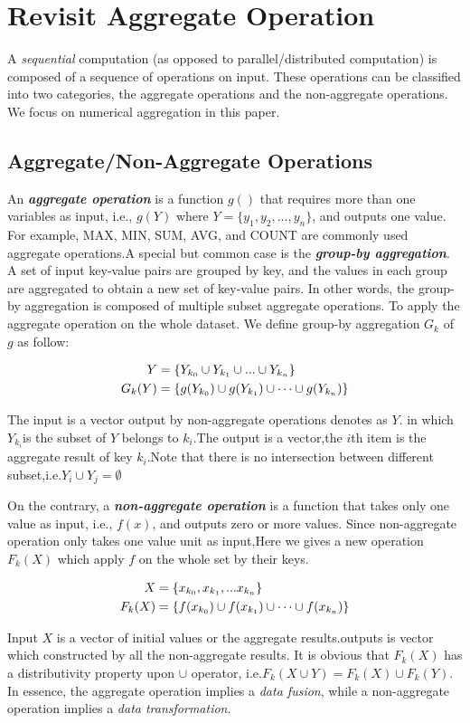 \section{Revisit Aggregate Operation}
\label{sec:aggre}

A \emph{sequential} computation (as opposed to parallel/distributed computation) is composed of a sequence of operations on input. These operations can be classified into two categories, the aggregate operations and the non-aggregate operations. We focus on numerical aggregation in this paper.
 \subsection{Aggregate/Non-Aggregate Operations}
An \emph{\textbf{aggregate operation}} is a function $g()$ that requires more than one variables as input, i.e., $g(Y)$ where $Y=\{y_1, y_2, \ldots, y_n\}$, and outputs one value. For example, MAX, MIN, SUM, AVG, and COUNT are commonly used aggregate operations.A special but common case is the \emph{\textbf{group-by aggregation}}. A set of input key-value pairs are grouped by key, and the values in each group are aggregated to obtain a new set of key-value pairs. In other words, the group-by aggregation is composed of multiple subset aggregate operations.
To apply the aggregate operation on the whole dataset. We define group-by aggregation $G_k$ of $g$ as follow: 
\begin{definition}
	\begin{align}
		 Y&=\{Y_{k_0} \cup Y_{k_1} \cup ... \cup Y_{k_n}\}\notag\\	 
	 G_k(Y)&=\{g(Y_{k_0}) \cup g(Y_{k_1}) \cup \dots \cup g(Y_{k_n})\} \notag
 \end{align}
\end{definition}

The input is a vector output by non-aggregate operations denotes as $Y$. in which $Y_{k_i}$is the subset of $Y$ belongs to $k_i$.The output is a vector,the $i$th item is the aggregate result of key $k_i$.Note that there is no intersection between different subset,i.e.$Y_i \cup Y_j = \emptyset $
 
On the contrary, a \emph{\textbf{non-aggregate operation}} is a function that takes only one value as input, i.e., $f(x)$, and outputs zero or more values. Since non-aggregate operation only takes one value unit as input,Here we gives a new operation $F_k(X)$ which apply $f$ on the whole set by their keys.
\begin{definition}
	\begin{align}
	X&=\{x_{k_0}, x_{k_1}, ... x_{k_n}\}\notag\\	 
	F_k(X)&=\{f(x_{k_0}) \cup f(x_{k_1}) \cup \dots \cup f(x_{k_n})\} \notag
	\end{align}
\end{definition}
Input $X$ is a vector of  initial values or the aggregate results.outputs is vector which constructed by all the non-aggregate results. 
 It is obvious that $F_k(X)$ has a distributivity property upon $\cup$ operator, i.e.$F_k(X \cup Y)=F_k(X) \cup F_k(Y)$.
In essence, the aggregate operation implies a \emph{data fusion}, while a non-aggregate operation implies a \emph{data transformation}.

